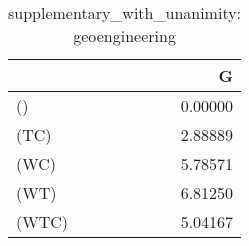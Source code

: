 \begin{table}
\centering
\caption{supplementary_with_unanimity: geoengineering}
\begin{tabular}{lr}
\toprule
{} &       G \\
\midrule
()    & 0.00000 \\
(TC)  & 2.88889 \\
(WC)  & 5.78571 \\
(WT)  & 6.81250 \\
(WTC) & 5.04167 \\
\bottomrule
\end{tabular}
\end{table}
